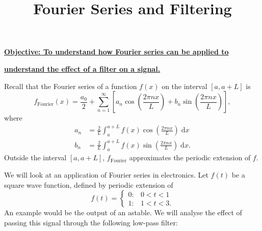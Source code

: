 \documentclass{article}
\newcommand{\diff}{\;\mathrm{d}}
\begin{document}
\title{Fourier Series and Filtering}
\date{}

\maketitle
\thispagestyle{empty}

\Large

\textbf{\underline{Objective: To understand how Fourier series can be applied to}}

\textbf{\underline{understand the effect of a filter on a signal.}}







\vspace{5mm}





Recall that the Fourier series of a function $f(x)$ on the interval $[a,a+L]$ is
\[f_\mathrm{Fourier}(x)=\frac{a_0}{2}+\sum_{n=1}^\infty \left[ a_n\cos\left(\frac{2\pi nx}{L}\right) + b_n\sin\left(\frac{2\pi nx}{L}\right)\right],\]
where
\begin{align*}
	a_n&=\frac{2}{L}\int_a^{a+L}f(x)\cos\left(\frac{2\pi nx}{L}\right)\diff x\\
	b_n&=\frac{2}{L}\int_a^{a+L} f(x)\sin\left(\frac{2\pi nx}{L}\right)\diff x.
\end{align*}
Outside the interval $[a,a+L]$, $f_\mathrm{Fourier}$ approximates the periodic extension of $f$.\bigskip


We will look at an application of Fourier series in electronics. Let $f(t)$ be a square wave function, defined by periodic extension of
\[f(t)=\begin{cases}
		0: & 0<t<1\\
		1: & 1<t<3.
	\end{cases}\]
An example would be the output of an astable. We will analyse the effect of passing this signal through the following low-pass filter:\bigskip

\begin{center}
\end{center}
\end{document}
